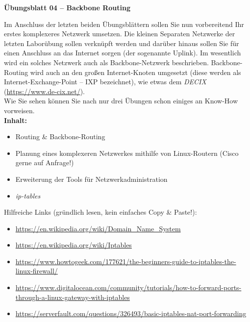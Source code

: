 \documentclass[paper=a4,fontsize=11pt]{scrartcl}%
\numberwithin{equation}{section}
\begin{document}
\begin{center}
\Large{\textbf{Übungsblatt 04 -- Backbone Routing}}\\
\end{center}
Im Anschluss der letzten beiden Übungsblättern sollen Sie nun vorbereitend Ihr erstes komplexeres Netzwerk umsetzen. Die kleinen Separaten Netzwerke der letzten Laborübung sollen verknüpft werden und darüber hinaus sollen Sie für einen Anschluss an das Internet sorgen (der sogenannte Uplink). Im wesentlich wird ein solches Netzwerk auch als Backbone-Netzwerk beschrieben. Backbone-Routing wird auch an den großen Internet-Knoten umgesetzt (diese werden als Internet-Exchange-Point -- IXP bezeichnet), wie etwas dem \emph{DECIX} (\url{https://www.de-cix.net/}).\\
Wie Sie sehen können Sie nach nur drei Übungen schon einiges an Know-How vorweisen.\\
\textbf{Inhalt:}
\begin{itemize}
	\item Routing \& Backbone-Routing 
	\item Planung eines komplexeren Netzwerkes mithilfe von Linux-Routern (Cisco gerne auf Anfrage!)
	\item Erweiterung der Tools für Netzwerkadministration
	\item \emph{ip-tables}
\end{itemize}
Hilfreiche Links (gründlich lesen, kein einfaches Copy \& Paste!):
\begin{itemize}
	\item \url{https://en.wikipedia.org/wiki/Domain_Name_System}
	\item \url{https://en.wikipedia.org/wiki/Iptables}
	\item \url{https://www.howtogeek.com/177621/the-beginners-guide-to-iptables-the-linux-firewall/}
	\item \url{https://www.digitalocean.com/community/tutorials/how-to-forward-ports-through-a-linux-gateway-with-iptables}
	\item \url{https://serverfault.com/questions/326493/basic-iptables-nat-port-forwarding}
\end{itemize}
\end{document}
